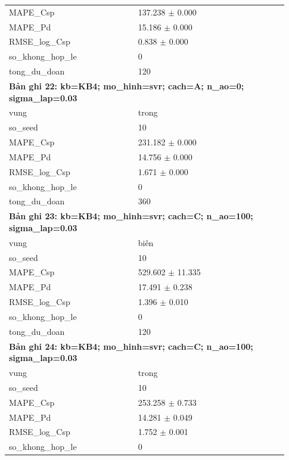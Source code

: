 \begin{longtable}{p{0.43\linewidth}p{0.50\linewidth}}
MAPE\_\allowbreak Csp & 137.238 $\pm$ 0.000 \\
MAPE\_\allowbreak Pd & 15.186 $\pm$ 0.000 \\
RMSE\_\allowbreak log\_\allowbreak Csp & 0.838 $\pm$ 0.000 \\
so\_\allowbreak khong\_\allowbreak hop\_\allowbreak le & 0 \\
tong\_\allowbreak du\_\allowbreak doan & 120 \\
\midrule
\multicolumn{2}{p{0.95\linewidth}}{\textbf{Bản ghi 22: kb=KB4; mo\_hinh=svr; cach=A; n\_ao=0; sigma\_lap=0.03}} \\
vung & trong \\
so\_\allowbreak seed & 10 \\
MAPE\_\allowbreak Csp & 231.182 $\pm$ 0.000 \\
MAPE\_\allowbreak Pd & 14.756 $\pm$ 0.000 \\
RMSE\_\allowbreak log\_\allowbreak Csp & 1.671 $\pm$ 0.000 \\
so\_\allowbreak khong\_\allowbreak hop\_\allowbreak le & 0 \\
tong\_\allowbreak du\_\allowbreak doan & 360 \\
\midrule
\multicolumn{2}{p{0.95\linewidth}}{\textbf{Bản ghi 23: kb=KB4; mo\_hinh=svr; cach=C; n\_ao=100; sigma\_lap=0.03}} \\
vung & biên \\
so\_\allowbreak seed & 10 \\
MAPE\_\allowbreak Csp & 529.602 $\pm$ 11.335 \\
MAPE\_\allowbreak Pd & 17.491 $\pm$ 0.238 \\
RMSE\_\allowbreak log\_\allowbreak Csp & 1.396 $\pm$ 0.010 \\
so\_\allowbreak khong\_\allowbreak hop\_\allowbreak le & 0 \\
tong\_\allowbreak du\_\allowbreak doan & 120 \\
\midrule
\multicolumn{2}{p{0.95\linewidth}}{\textbf{Bản ghi 24: kb=KB4; mo\_hinh=svr; cach=C; n\_ao=100; sigma\_lap=0.03}} \\
vung & trong \\
so\_\allowbreak seed & 10 \\
MAPE\_\allowbreak Csp & 253.258 $\pm$ 0.733 \\
MAPE\_\allowbreak Pd & 14.281 $\pm$ 0.049 \\
RMSE\_\allowbreak log\_\allowbreak Csp & 1.752 $\pm$ 0.001 \\
so\_\allowbreak khong\_\allowbreak hop\_\allowbreak le & 0 \\

\end{longtable}
